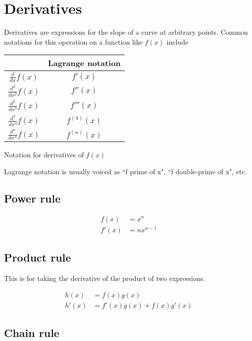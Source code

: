 \section{Derivatives}

Derivatives are expressions for the slope of a curve at arbitrary points. Common
notations for this operation on a function like $f(x)$ include

\begin{booktable}
  \begin{tabular}{|cc|}
    \hline
    \rowcolor{headingbg}
    \multicolumn{1}{|c}{\textbf{Leibniz notation}} &
      \multicolumn{1}{c|}{\textbf{Lagrange notation}} \\
    \hline
    $\frac{d}{dx} f(x)$ & $f'(x)$ \\
    $\frac{d^2}{dx^2} f(x)$ & $f''(x)$ \\
    $\frac{d^3}{dx^3} f(x)$ & $f'''(x)$ \\
    $\frac{d^4}{dx^4} f(x)$ & $f^{(4)}(x)$ \\
    $\frac{d^n}{dx^n} f(x)$ & $f^{(n)}(x)$ \\
    \hline
  \end{tabular}
  \caption{Notation for derivatives of $f(x)$}
  \label{tab:derivative_notation}
\end{booktable}

Lagrange notation is usually voiced as ``f prime of x", ``f double-prime of x",
etc.

\subsection{Power rule}

\begin{align*}
  f(x) &= x^n \\
  f'(x) &= nx^{n - 1}
\end{align*}

\subsection{Product rule}

This is for taking the derivative of the product of two expressions.

\begin{align*}
  h(x) &= f(x)g(x) \\
  h'(x) &= f'(x)g(x) + f(x)g'(x)
\end{align*}

\subsection{Chain rule}

